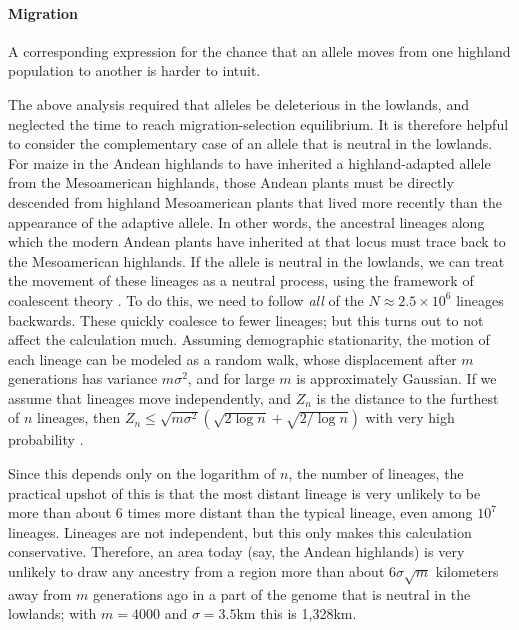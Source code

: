 \paragraph{Migration}
A corresponding expression for the chance that an allele moves from one highland population to another is harder to intuit.

The above analysis required that alleles be deleterious in the lowlands, 
and neglected the time to reach migration-selection equilibrium.
It is therefore helpful to consider the complementary case of an allele that is neutral in the lowlands.
For maize in the Andean highlands to have inherited a highland-adapted allele from the Mesoamerican highlands, 
those Andean plants must be directly descended from highland Mesoamerican plants that lived more recently than the appearance of the adaptive allele.
In other words, the ancestral lineages along which the modern Andean plants have inherited at that locus must trace back to the Mesoamerican highlands.
If the allele is neutral in the lowlands, we can treat the movement of these lineages as a neutral process, using the framework of coalescent theory 
\citep{wakeley2005coalescent}.
To do this, we need to follow \emph{all} of the $N \approx 2.5 \times 10^6$ lineages backwards.
These quickly coalesce to fewer lineages;
but this turns out to not affect the calculation much.
Assuming demographic stationarity,
the motion of each lineage can be modeled as a random walk,
whose displacement after $m$ generations has variance $m \sigma^2$, and for large $m$ is approximately Gaussian.
If we assume that lineages move independently, 
and $Z_n$ is the distance to the furthest of $n$ lineages, 
then $Z_n \le \sqrt{m \sigma^2} ( \sqrt{2 \log n} + \sqrt{2/\log n} )$ with very high probability
\citep{berman1964limit}. 

Since this depends only on the logarithm of $n$, the number of lineages,
the practical upshot of this is that the most distant lineage
is very unlikely to be more than about 6 times more distant than the typical lineage,
even among $10^7$ lineages.
Lineages are not independent, but this only makes this calculation conservative.
Therefore, an area today (say, the Andean highlands)
is very unlikely to draw any ancestry from a region more than about $6 \sigma \sqrt{m}$ kilometers away from $m$ generations ago
in a part of the genome that is neutral in the lowlands;
with $m=4000$ and $\sigma=3.5$km this is 1,328km.

